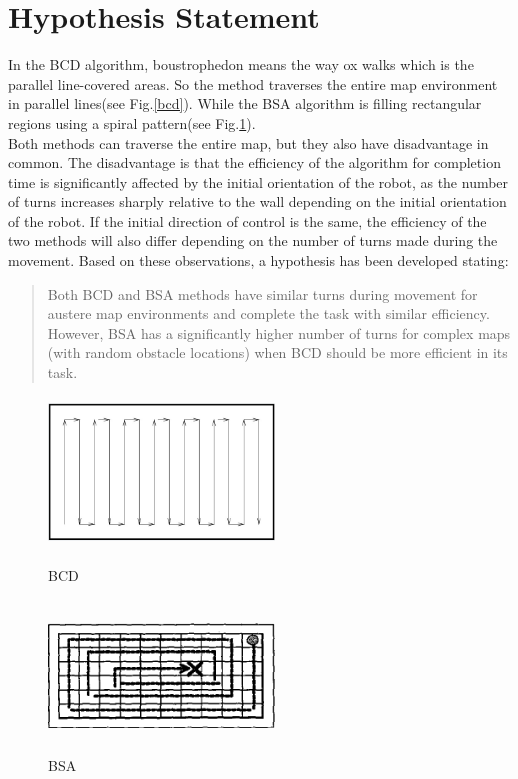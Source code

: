 \documentclass[conference]{IEEEtran}
\begin{document}
\section{Hypothesis Statement}
In the BCD algorithm, boustrophedon\cite{choset1998coverage} means the way ox walks which is the parallel line-covered areas. So the method traverses the entire map environment in parallel lines(see Fig.\ref{bcd}). While the BSA algorithm\cite{Gonzlez2003BSAAC} is filling rectangular regions using a spiral pattern(see Fig.\ref{bsa}).\\
Both methods can traverse the entire map, but they also have disadvantage in common. The disadvantage\cite{choi2009online} is that the efficiency of the algorithm for completion time is significantly affected by the initial orientation of the robot, as the number of turns increases sharply relative to the wall depending on the initial orientation of the robot. If the initial direction of control is the same, the efficiency of the two methods will also differ depending on the number of turns made during the movement.
Based on these observations, a hypothesis has been developed stating:
\begin{quote}
     Both BCD and BSA methods have similar turns during movement for austere map environments and complete the task with similar efficiency. However, BSA has a significantly higher number of turns for complex maps (with random obstacle locations) when BCD should be more efficient in its task.
\end{quote}

\begin{figure}[htbp]
\centering
\begin{minipage}[t]{0.48\textwidth}
\centering
\includegraphics[width=6cm,height=4cm]{RS_Report/bcd.png}
\caption{BCD}
\label{bcd}
\end{minipage}
\begin{minipage}[t]{0.48\textwidth}
\centering
\includegraphics[width=6cm,height=4cm]{RS_Report/BSA.png}
\caption{BSA}
\label{bsa}
\end{minipage}
\end{figure}
\end{document}
